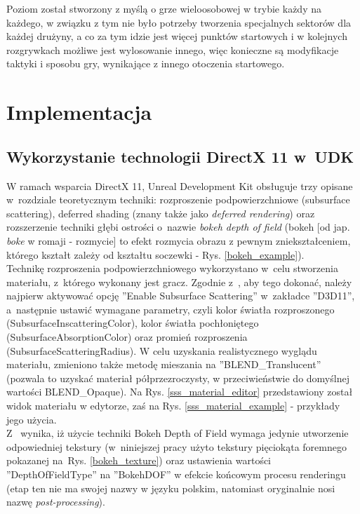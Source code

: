 Poziom został stworzony z myślą o grze wieloosobowej w trybie każdy na każdego, w związku z tym nie było potrzeby tworzenia specjalnych sektorów dla każdej drużyny, a co za tym idzie jest więcej punktów startowych i w kolejnych rozgrywkach możliwe jest wylosowanie innego, więc konieczne są modyfikacje taktyki i sposobu gry, wynikające z innego otoczenia startowego.

\section{Implementacja}

\subsection{Wykorzystanie technologii DirectX 11 w~UDK}

W ramach wsparcia DirectX 11, Unreal Development Kit obsługuje trzy opisane w~rozdziale teoretycznym techniki: rozproszenie podpowierzchniowe (subsurface scattering), deferred shading (znany także jako \emph{deferred rendering}) oraz rozszerzenie techniki głębi ostrości o~nazwie \emph{bokeh depth of field} (bokeh [od jap. \emph{boke} w romaji - rozmycie] to efekt rozmycia obrazu z pewnym zniekształceniem, którego kształt zależy od kształtu soczewki - Rys. \ref{bokeh_example}).\\

Technikę rozproszenia podpowierzchniowego wykorzystano w~celu stworzenia materiału, z~którego wykonany jest gracz. Zgodnie z~\cite{udk_sss}, aby tego dokonać, należy najpierw aktywować opcję ''Enable Subsurface Scattering'' w~zakładce ''D3D11'', a~następnie ustawić wymagane parametry, czyli kolor światła rozproszonego (SubsurfaceInscatteringColor), kolor światła pochłoniętego (SubsurfaceAbsorptionColor) oraz promień rozproszenia (SubsurfaceScatteringRadius). W celu uzyskania realistycznego wyglądu materiału, zmieniono także metodę mieszania na ''BLEND\_Translucent'' (pozwala to uzyskać materiał półprzezroczysty, w przeciwieństwie do domyślnej wartości BLEND\_Opaque). Na Rys. \ref{sss_material_editor} przedstawiony został widok materiału w edytorze, zaś na Rys. \ref{sss_material_example} - przykłady jego użycia.\\

Z~\cite{udk_bokeh_dof} wynika, iż użycie techniki Bokeh Depth of Field wymaga jedynie utworzenie odpowiedniej tekstury (w~niniejszej pracy użyto tekstury pięciokąta foremnego pokazanej na~Rys. \ref{bokeh_texture}) oraz ustawienia wartości ''DepthOfFieldType'' na ''BokehDOF'' w efekcie końcowym procesu renderingu (etap ten nie ma swojej nazwy w języku polskim, natomiast oryginalnie nosi nazwę \emph{post-processing}).\\


